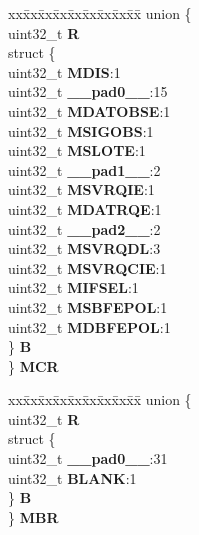 \begin{DoxyCompactItemize}
\item 
\mbox{\label{structMLB__tag_a210bf5e5ee1fa6dbf190552aa08d6cee}} 
\begin{tabbing}
xx\=xx\=xx\=xx\=xx\=xx\=xx\=xx\=xx\=\kill
union \{\\
\>uint32\_t {\bfseries R}\\
\>struct \{\\
\>\>uint32\_t {\bfseries MDIS}:1\\
\>\>uint32\_t {\bfseries \_\_pad0\_\_}:15\\
\>\>uint32\_t {\bfseries MDATOBSE}:1\\
\>\>uint32\_t {\bfseries MSIGOBS}:1\\
\>\>uint32\_t {\bfseries MSLOTE}:1\\
\>\>uint32\_t {\bfseries \_\_pad1\_\_}:2\\
\>\>uint32\_t {\bfseries MSVRQIE}:1\\
\>\>uint32\_t {\bfseries MDATRQE}:1\\
\>\>uint32\_t {\bfseries \_\_pad2\_\_}:2\\
\>\>uint32\_t {\bfseries MSVRQDL}:3\\
\>\>uint32\_t {\bfseries MSVRQCIE}:1\\
\>\>uint32\_t {\bfseries MIFSEL}:1\\
\>\>uint32\_t {\bfseries MSBFEPOL}:1\\
\>\>uint32\_t {\bfseries MDBFEPOL}:1\\
\>\} {\bfseries B}\\
\} {\bfseries MCR}\\

\end{tabbing}\item 
\mbox{\label{structMLB__tag_a45e50dcd9166db59a51d42be8f4b968f}} 
\begin{tabbing}
xx\=xx\=xx\=xx\=xx\=xx\=xx\=xx\=xx\=\kill
union \{\\
\>uint32\_t {\bfseries R}\\
\>struct \{\\
\>\>uint32\_t {\bfseries \_\_pad0\_\_}:31\\
\>\>uint32\_t {\bfseries BLANK}:1\\
\>\} {\bfseries B}\\
\} {\bfseries MBR}\\


\end{tabbing}
\end{DoxyCompactItemize}

